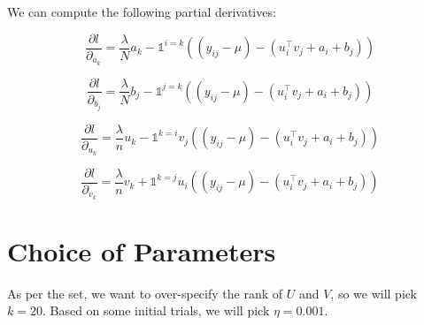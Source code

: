 \documentclass{article}
\begin{document}
We can compute the following partial derivatives:

$$ \frac{\partial l}{\partial_{a_{k}}} = \frac{\lambda}{N} a_{k} - \mathds{1}^{i = k}((y_{ij} - \mu) -
(u_{i}^{\intercal}v_{j} + a_{i} + b_{j})) $$

$$ \frac{\partial l}{\partial_{b_{j}}} = \frac{\lambda}{N} b_{j} - \mathds{1}^{j=k}((y_{ij} - \mu) -
(u_{i}^{\intercal}v_{j} + a_{i} + b_{j})) $$


$$ \frac{\partial l}{\partial_{u_{k}}} = \frac{\lambda}{n} u_{k} - \mathds{1}^{k = i} v_{j}((y_{ij} - \mu) -
(u_{i}^{\intercal}v_{j} + a_{i} + b_{j}))  $$

$$ \frac{\partial l}{\partial_{v_{k}}} = \frac{\lambda}{n} v_{k} + \mathds{1}^{k = j} u_{i}((y_{ij} - \mu) -
(u_{i}^{\intercal}v_{j} + a_{i} + b_{j})) $$

\section*{Choice of Parameters}
As per the set, we want to over-specify the rank of $U$ and $V$, so we will pick $k = 20$. Based on some initial trials, we will pick $\eta = 0.001$.
\end{document}
